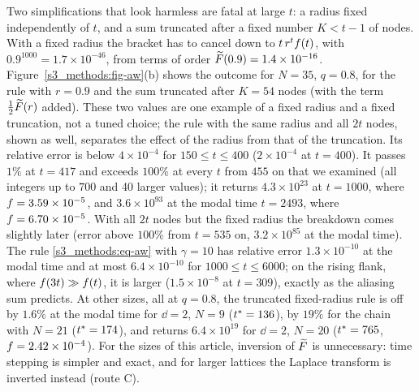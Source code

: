 Two simplifications that look harmless are fatal at large $t$: a radius fixed independently of $t$, and a sum
truncated after a fixed number $K<t-1$ of nodes. With a fixed radius the bracket has to cancel down to
$t\,r^{t}f(t)$, with $0.9^{1000}=1.7\times10^{-46}$, from terms of order $\widetilde{F}(0.9)=1.4\times10^{-16}$.
Figure~\ref{s3_methods:fig-aw}(b) shows the outcome for $N=35$, $q=0.8$, for the rule with $r=0.9$ and the sum
truncated after $K=54$ nodes (with the term $\frac12\widetilde{F}(r)$ added). These two values are one example of a fixed radius
and a fixed truncation, not a tuned choice; the rule with the same radius and all $2t$ nodes, shown as well, separates
the effect of the radius from that of the truncation. Its relative error is below $4\times10^{-4}$ for
$150\le t\le400$ ($2\times10^{-4}$ at $t=400$). It passes $1\%$ at $t=417$ and exceeds $100\%$ at every $t$ from $455$
on that we examined (all integers up to $700$ and 40 larger values); it returns $4.3\times10^{23}$ at $t=1000$, where
$f=3.59\times10^{-5}$, and $3.6\times10^{93}$ at the modal time $t=2493$, where $f=6.70\times10^{-5}$. With all
$2t$ nodes but the fixed radius the breakdown comes slightly later (error above $100\%$ from $t=535$ on,
$3.2\times10^{85}$ at the modal time). The rule \eqref{s3_methods:eq-aw} with $\gamma=10$ has relative error
$1.3\times10^{-10}$ at the modal time and at most $6.4\times10^{-10}$ for $1000\le t\le6000$; on the rising flank,
where $f(3t)\gg f(t)$, it is larger ($1.5\times10^{-8}$ at $t=309$), exactly as the aliasing sum predicts.
At other sizes, all at $q=0.8$, the truncated fixed-radius rule is off by $1.6\%$ at the modal time for $\dd=2$,
$N=9$ ($t^{*}=136$), by $19\%$ for the chain with $N=21$ ($t^{*}=174$), and returns $6.4\times10^{19}$ for $\dd=2$,
$N=20$ ($t^{*}=765$, $f=2.42\times10^{-4}$).
For the sizes of this article, inversion of $\widetilde{F}$ is unnecessary: time stepping is simpler and exact, and for larger
lattices the Laplace transform is inverted instead (route C).
